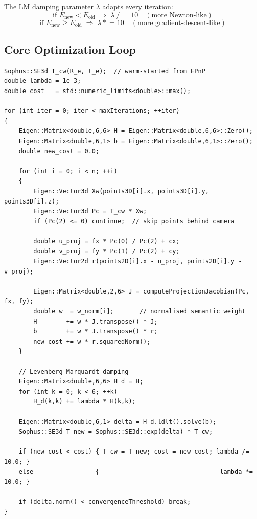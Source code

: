\documentclass[12pt,a4paper]{article}
\begin{document}
The LM damping parameter $\lambda$ adapts every iteration:
\[
  \text{if } E_{\text{new}} < E_{\text{old}} \;\Rightarrow\; \lambda \mathrel{/}= 10
  \quad(\text{more Newton-like})
\]
\[
  \text{if } E_{\text{new}} \geq E_{\text{old}} \;\Rightarrow\; \lambda \mathrel{*}= 10
  \quad(\text{more gradient-descent-like})
\]

\subsection{Core Optimization Loop}

\begin{lstlisting}[style=cpp,
  caption={LM core loop ---
           \texttt{relocalization.cpp}, lines\,1254--1302 (abridged)}]
Sophus::SE3d T_cw(R_e, t_e);  // warm-started from EPnP
double lambda = 1e-3;
double cost   = std::numeric_limits<double>::max();

for (int iter = 0; iter < maxIterations; ++iter)
{
    Eigen::Matrix<double,6,6> H = Eigen::Matrix<double,6,6>::Zero();
    Eigen::Matrix<double,6,1> b = Eigen::Matrix<double,6,1>::Zero();
    double new_cost = 0.0;

    for (int i = 0; i < n; ++i)
    {
        Eigen::Vector3d Xw(points3D[i].x, points3D[i].y, points3D[i].z);
        Eigen::Vector3d Pc = T_cw * Xw;
        if (Pc(2) <= 0) continue;  // skip points behind camera

        double u_proj = fx * Pc(0) / Pc(2) + cx;
        double v_proj = fy * Pc(1) / Pc(2) + cy;
        Eigen::Vector2d r(points2D[i].x - u_proj, points2D[i].y - v_proj);

        Eigen::Matrix<double,2,6> J = computeProjectionJacobian(Pc, fx, fy);
        double w  = w_norm[i];       // normalised semantic weight
        H        += w * J.transpose() * J;
        b        += w * J.transpose() * r;
        new_cost += w * r.squaredNorm();
    }

    // Levenberg-Marquardt damping
    Eigen::Matrix<double,6,6> H_d = H;
    for (int k = 0; k < 6; ++k)
        H_d(k,k) += lambda * H(k,k);

    Eigen::Matrix<double,6,1> delta = H_d.ldlt().solve(b);
    Sophus::SE3d T_new = Sophus::SE3d::exp(delta) * T_cw;

    if (new_cost < cost) { T_cw = T_new; cost = new_cost; lambda /= 10.0; }
    else                 {                                 lambda *= 10.0; }

    if (delta.norm() < convergenceThreshold) break;
}
\end{lstlisting}
\end{document}
